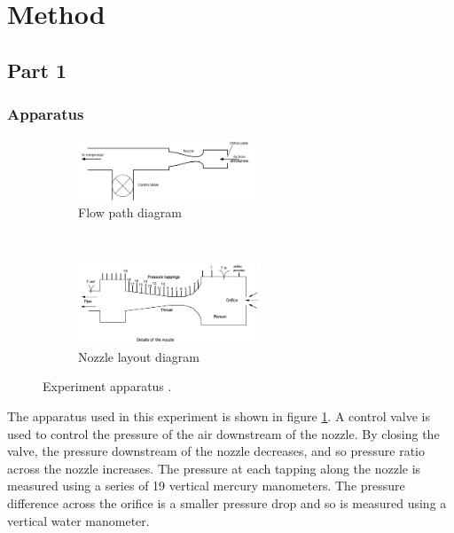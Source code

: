 \documentclass{article}
\begin{document}
\section{Method}
\subsection{Part 1}
\subsubsection{Apparatus}

\begin{figure}[H]
    \centering
    \begin{subfigure}{0.8\textwidth}
        \centering
        \includegraphics[width=0.6\textwidth]{flow_layout.png}
        \caption{Flow path diagram}
        \label{fig:flow_layout}
    \end{subfigure}
    ~
    \begin{subfigure}{0.8\textwidth}
        \centering
        \includegraphics[width=0.6\textwidth]{../Supersonic_Nozzle/small_nozzle_layout.png}
        \caption{Nozzle layout diagram}
        \label{fig:nozzle_layout}
    \end{subfigure}
    \caption{Experiment apparatus \cite{lab_manual}.}
\end{figure}

The apparatus used in this experiment is shown in figure \ref{fig:flow_layout}.
A control valve is used to control the pressure of the air downstream of the nozzle. By closing the valve, the pressure downstream of the nozzle decreases, and so pressure ratio across the nozzle increases.
The pressure at each tapping along the nozzle is measured using a series of 19 vertical mercury manometers.
The pressure difference across the orifice is a smaller pressure drop and so is measured using a vertical water manometer.
\end{document}
